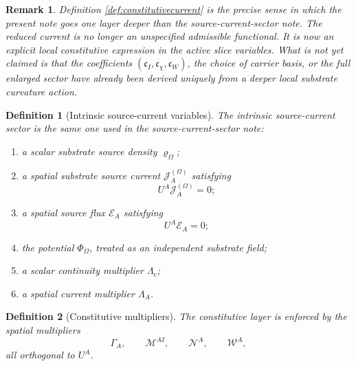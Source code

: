 \documentclass[11pt]{article}
\newcommand{\FlowPot}{\Phi_\Omega}
\newcommand{\SourceDensity}{\varrho_\Omega}
\newcommand{\SourceCurrent}{\mathcal J^{(\Omega)}}
\newcommand{\ContMult}{\Lambda_{\mathrm c}}
\newcommand{\CurrentMult}{\Lambda}
\newcommand{\ConstGamma}{\Gamma}
\newcommand{\QMult}{\mathscr M}
\newcommand{\ChiMult}{\mathscr N}
\newcommand{\TransMult}{\mathscr W}
\newcommand{\SourceFlux}{\mathcal E}
\newtheorem{definition}{Definition}
\newtheorem{remark}{Remark}
\begin{document}
\begin{remark}
Definition \ref{def:constitutivecurrent} is the precise sense in which the present note goes one layer deeper than the source-current-sector note. The reduced current is no longer an unspecified admissible functional. It is now an explicit local constitutive expression in the active slice variables. What is \emph{not} yet claimed is that the coefficients \((\mathfrak c_I,\mathfrak c_\chi,\mathfrak c_W)\), the choice of carrier basis, or the full enlarged sector have already been derived uniquely from a deeper local substrate curvature action.
\end{remark}

\begin{definition}[Intrinsic source-current variables]
\label{def:sourcevars}
The \emph{intrinsic source-current sector} is the same one used in the source-current-sector note:
\begin{enumerate}
    \item a scalar substrate source density \(\SourceDensity\);
    \item a spatial substrate source current \(\SourceCurrent_A\) satisfying
    \begin{equation}
    U^A\SourceCurrent_A=0;
    \label{eq:spatialcurrent}
    \end{equation}
    \item a spatial source flux \(\SourceFlux_A\) satisfying
    \begin{equation}
    U^A\SourceFlux_A=0;
    \label{eq:spatialflux}
    \end{equation}
    \item the potential \(\FlowPot\), treated as an independent substrate field;
    \item a scalar continuity multiplier \(\ContMult\);
    \item a spatial current multiplier \(\CurrentMult_A\).
\end{enumerate}
\end{definition}

\begin{definition}[Constitutive multipliers]
\label{def:mults}
The constitutive layer is enforced by the spatial multipliers
\begin{equation}
\ConstGamma_A,
\qquad
\QMult^{AI},
\qquad
\ChiMult^A,
\qquad
\TransMult^A,
\label{eq:mults}
\end{equation}
all orthogonal to \(U^A\).
\end{definition}
\end{document}
